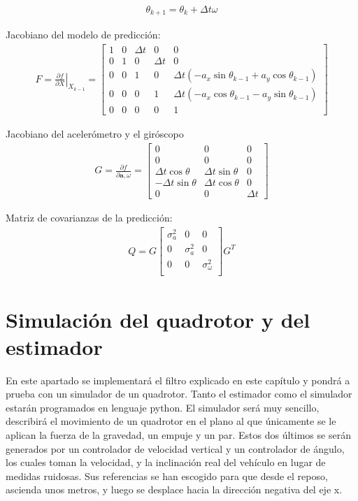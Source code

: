 \begin{align}
\theta_{k+1} = \theta_k + \Delta t \omega
\end{align}


Jacobiano del modelo de predicción:
\begin{align}
F =\left. \frac{\partial f}{\partial X}\right| _{X_{k-1}} =  
\begin{bmatrix} 
1 	&0	&\Delta t	&0		&0\\
0 	&1	&0		&\Delta t	&0\\
0 	&0	&1		&0		&\Delta t\left(-a_x\sin{\theta_{k-1}} + a_y\cos{\theta_{k-1}}\right) \\
0 	&0	&0		&1		&\Delta t\left(-a_x\cos{\theta_{k-1}} - a_y\sin{\theta_{k-1}}\right) \\
0 	&0	&0		&0		&1
\end{bmatrix}
\end{align}

Jacobiano del acelerómetro y el giróscopo
\begin{align}
G =  \frac{\partial f}{\partial \bm{a},\omega} = 
\begin{bmatrix} 
0 			&0			&0\\
0 			&0			&0\\
\Delta t \cos{\theta} 	&\Delta t \sin{\theta}	&0\\
-\Delta t \sin{\theta} 	&\Delta t \cos{\theta}	&0\\
0 			&0			&\Delta t		
\end{bmatrix}
\end{align}

Matriz de covarianzas de la predicción:
\begin{align}
Q = 
G
\begin{bmatrix} 
\sigma^2_a 	& 0 		& 0\\
0 		& \sigma^2_a 	& 0\\
0 		& 0 		& \sigma^2_\omega\\
\end{bmatrix}
G^T
\end{align}

\section{Simulación del quadrotor y del estimador}
En este apartado se implementará el filtro explicado en este capítulo y pondrá a prueba con un simulador de un quadrotor. Tanto el estimador como el simulador estarán programados en lenguaje python. El simulador será muy sencillo, describirá el movimiento de un quadrotor en el plano al que únicamente se le aplican la fuerza de la gravedad, un empuje y un par. Estos dos últimos se serán generados por un controlador de velocidad vertical y un controlador de ángulo, los cuales toman la velocidad, y la inclinación real del vehículo en lugar de medidas ruidosas. Sus referencias se han escogido para que desde el reposo, ascienda unos metros, y luego se desplace hacia la dirección negativa del eje x. 


